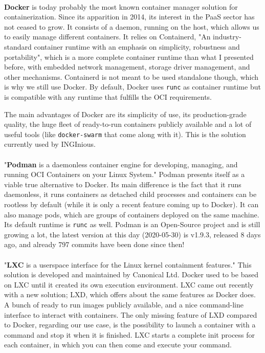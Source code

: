 \paragraph{}\textbf{Docker}\cite{merkel2014docker} is today probably the most known container manager solution for containerization.  Since its apparition in 2014, its interest in the PaaS sector has not ceased to grow.  It consists of a daemon, running on the host, which allows us to easily manage different containers.  It relies on Containerd, "An industry-standard container runtime with an emphasis on simplicity, robustness and portability"\cite{containerd}, which is a more complete container runtime than what I presented before, with embedded network management, storage driver management, and other mechanisms.  Containerd is not meant to be used standalone though, which is why we still use Docker.  By default, Docker uses \texttt{runc} as container runtime but is compatible with any runtime that fulfills the OCI\cite{oci} requirements.

The main advantages of Docker are its simplicity of use, its production-grade quality, the huge fleet of ready-to-run containers publicly available and a lot of useful tools (like \texttt{docker-swarm} that come along with it).  This is the solution currently used by INGInious.

\paragraph{}"\textbf{Podman} is a daemonless container engine for developing, managing, and running OCI\cite{oci} Containers on your Linux System."\cite{podman}  Podman presents itself as a viable true alternative to Docker.  Its main difference is the fact that it runs daemonless, it runs containers as detached child processes and containers can be rootless by default (while it is only a recent feature coming up to Docker).  It can also manage pods, which are groups of containers deployed on the same machine. Its default runtime is \texttt{runc} as well.  Podman is an Open-Source project and is still growing a lot, the latest version at this day (2020-05-30) is v1.9.3, released 8 days ago, and already 797 commits have been done since then!

\paragraph{}"\textbf{LXC} is a userspace interface for the Linux kernel containment features."\cite{lxc}  This solution is developed and maintained by Canonical Ltd.  Docker used to be based on LXC until it created its own execution environment.  LXC came out recently with a new solution; LXD, which offers about the same features as Docker does.  A bunch of ready to run images publicly available, and a nice command-line interface to interact with containers.  The only missing feature of LXD compared to Docker, regarding our use case, is the possibility to launch a container with a command and stop it when it is finished.  LXC starts a complete init process for each container, in which you can then come and execute your command.

